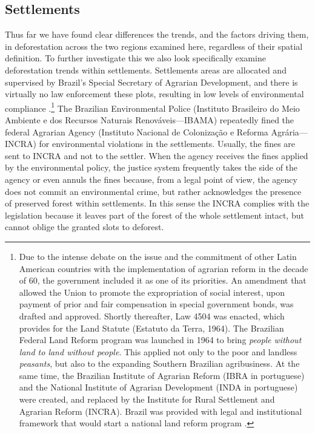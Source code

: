 \subsection{Settlements}

Thus far we have found clear differences the trends, and the factors driving them, in deforestation across the two regions examined here, regardless of their spatial definition.  To further investigate this we also look specifically examine deforestation trends within settlements. Settlements areas are allocated and supervised by Brazil’s Special Secretary of Agrarian Development, and there is virtually no law enforcement these plots, resulting in low levels of environmental compliance \citep{PERES2}.\footnote{Due to the intense debate on the issue and the commitment of other Latin American countries with the implementation of agrarian reform in the decade of 60, the government included it as one of its priorities. An amendment that allowed the Union to promote the expropriation of social interest, upon payment of prior and fair compensation in special government bonds, was drafted and approved. Shortly thereafter, Law 4504 was enacted, which provides for the Land Statute (Estatuto da Terra, 1964). The Brazilian Federal Land Reform program was launched in 1964  to bring \textit{people without land to land without people}. This applied not only to the poor and landless \textit{peasants}, but also to the expanding Southern Brazilian agribusiness. At the same time, the Brazilian Institute of Agrarian Reform (IBRA in portuguese) and the National Institute of Agrarian Development (INDA in portuguese) were created, and replaced by the Institute for Rural Settlement and Agrarian Reform (INCRA). Brazil was provided with legal and institutional framework that would start a national land reform program \citep{ESPADA}.} The Brazilian Environmental Police (Instituto Brasileiro do Meio Ambiente e dos Recursos Naturais Renováveis—IBAMA) repeatedly fined the federal Agrarian Agency (Instituto Nacional de Colonização e Reforma Agrária—INCRA) for environmental violations in the settlements. Usually, the fines are sent to INCRA and not to the settler. When the agency receives the fines applied by the environmental policy, the justice system frequently takes the side of the agency or even annuls the fines because, from a legal point of view, the agency does not commit an environmental crime, but rather acknowledges the presence of preserved forest within settlements. In this sense the INCRA complies with the legislation because it leaves part of the forest of the whole settlement intact, but cannot oblige the granted slots to deforest. 

